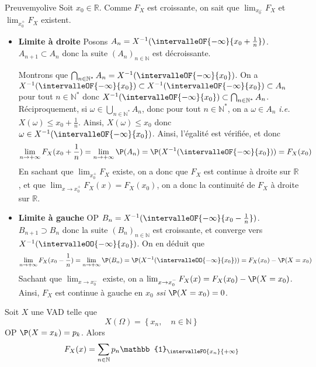     \begin{demo}{Preuve}{myolive}
        Soit $x_0 \in \mathbb{R}$. Comme $F_X$ est croissante, on sait que $\lim_{x_0^-} F_X$ et $\lim_{x_0^+} F_X$ existent. 
        \begin{itemize}
            \item \textbf{Limite à droite} \quad Posons $A_n = X^{-1}(\intervalleOF{-\infty}{x_0 + \frac{1}{n}})$. $A_{n+1} \subset A_n$ donc la suite $(A_n)_{n \in \mathbb{N}}$ est décroissante. 
            
            Montrons que $\bigcap_{n \in \mathbb{N}^*} A_n = X^{-1}(\intervalleOF{-\infty}{x_0})$. On a $X^{-1}(\intervalleOF{-\infty}{x_0}) \subset X^{-1}(\intervalleOF{-\infty}{x_0}) \subset A_n$ pour tout $n \in \mathbb{N}^*$ donc $X^{-1}(\intervalleOF{-\infty}{x_0}) \subset \bigcap_{n \in \mathbb{N}^*} A_n$. Réciproquement, si $\omega \in \bigcup_{n \in \mathbb{N}^*} A_n$, donc pour tout $n \in \mathbb{N}^*$, on a $\omega \in A_n$ \textit{i.e.} $X(\omega) \leq x_0 + \frac{1}{n}$. Ainsi, $X(\omega) \leq x_0$ donc $\omega \in X^{-1}(\intervalleOF{-\infty}{x_0})$. Ainsi, l’égalité est vérifiée, et donc 
            \[ \lim_{n \to +\infty} F_X(x_0 + \frac{1}{n}) = \lim_{n \to +\infty} \P(A_n) = \P(X^{-1}(\intervalleOF{-\infty}{x_0})) = F_X(x_0) \]  
            En sachant que $\lim_{x_0^+} F_X$ existe, on a donc que $F_X$ est continue à droite sur $\mathbb{R}$, et que $\lim_{x \to x_0^+} F_X(x) = F_X(x_0)$, on a donc la continuité de $F_X$ à droite sur $\mathbb{R}$.
            \item \textbf{Limite à gauche} \quad OP $B_n = X^{-1}(\intervalleOF{-\infty}{x_0 - \frac{1}{n}})$. $B_{n+1} \supset B_n$ donc la suite $(B_n)_{n \in \mathbb{N}}$ est croissante, et converge vers $X^{-1}(\intervalleOO{-\infty}{x_0})$. On en déduit que 
            \[ \lim_{n \to +\infty} F_X(x_0 - \frac{1}{n}) = \lim_{n \to +\infty} \P(B_n) = \P(X^{-1}(\intervalleOO{-\infty}{x_0})) = F_X(x_0) - \P(X = x_0) \]   
            Sachant que $\lim_{x \to x_0^-}$ existe, on a $\lim_{x \to x_0^-} F_X(x) = F_X(x_0) - \P(X = x_0)$. Ainsi, $F_X$ est continue à gauche en $x_0$ \textit{ssi} $\P(X = x_0) = 0$.
        \end{itemize}
    \end{demo}

    \begin{prop}{}{}
        Soit $X$ une VAD telle que 
        \[ X(\Omega) = \left\{x_n, \quad n \in \mathbb{N}\right\} \]   
        OP $\P(X = x_k) = p_k$. Alors 
        \[ F_X(x) = \sum_{n \in \mathbb{N}} p_n \mathbb{1}_{\intervalleFO{x_n}{+\infty}} \]   
    \end{prop}

